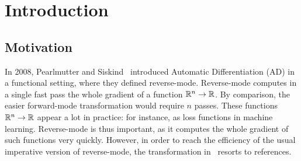 \section{Introduction}
\label{sec:intro}



\subsection{Motivation}

In 2008, Pearlmutter and Siskind~\cite{pearlmutter2008reverse} introduced Automatic Differentiation (AD) in a functional setting, where they defined reverse-mode. 
Reverse-mode computes in a single fast pass the whole gradient of a function $\mathbb{R}^n\to\mathbb{R}$.
By comparison, the easier forward-mode transformation would require $n$ passes. 
These functions $\mathbb{R}^n\to\mathbb{R}$ appear a lot in practice: for instance, as loss functions in machine learning.
Reverse-mode is thus important, as it computes the whole gradient of such functions very quickly. 
However, in order to reach the efficiency of the usual imperative version of reverse-mode, the transformation in~\cite{pearlmutter2008reverse} resorts to references.

